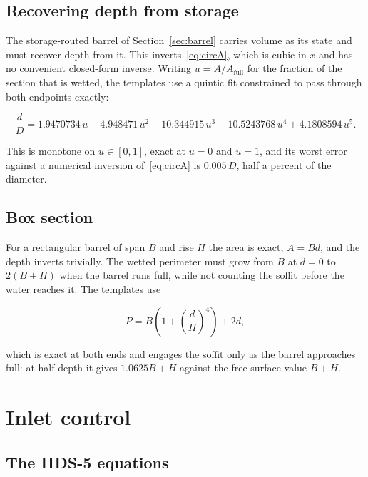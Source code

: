 \documentclass[11pt,a4paper]{article}
\begin{document}
\subsection{Recovering depth from storage}\label{sec:invert}

The storage-routed barrel of Section~\ref{sec:barrel} carries volume as its
state and must recover depth from it. This inverts~\eqref{eq:circA}, which is
cubic in $x$ and has no convenient closed-form inverse. Writing
$u=A/A_{\mathrm{full}}$ for the fraction of the section that is wetted, the
templates use a quintic fit constrained to pass through both endpoints exactly:

\begin{equation}
\frac{d}{D}=1.9470734\,u-4.948471\,u^{2}+10.344915\,u^{3}
           -10.5243768\,u^{4}+4.1808594\,u^{5}.
\label{eq:circinv}
\end{equation}

\noindent
This is monotone on $u\in[0,1]$, exact at $u=0$ and $u=1$, and its worst error
against a numerical inversion of~\eqref{eq:circA} is $0.005\,D$, half a percent
of the diameter.

\subsection{Box section}

For a rectangular barrel of span $B$ and rise $H$ the area is exact,
$A=Bd$, and the depth inverts trivially. The wetted perimeter must grow from
$B$ at $d=0$ to $2(B+H)$ when the barrel runs full, while not counting the
soffit before the water reaches it. The templates use

\begin{equation}
P = B\left(1+\left(\frac{d}{H}\right)^{4}\right)+2d,
\label{eq:boxP}
\end{equation}

\noindent
which is exact at both ends and engages the soffit only as the barrel
approaches full: at half depth it gives $1.0625B+H$ against the free-surface
value $B+H$.

\section{Inlet control}\label{sec:inlet}

\subsection{The HDS-5 equations}
\end{document}
